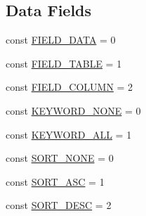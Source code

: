 \subsection*{Data Fields}
\begin{DoxyCompactItemize}
\item 
const \hyperlink{class_s_q_lite_database_ac3188f4350978425c488580c5cea8468}{F\+I\+E\+L\+D\+\_\+\+D\+A\+T\+A} = 0
\item 
const \hyperlink{class_s_q_lite_database_acbdf154a35cfc228dd1016e8aa4bd503}{F\+I\+E\+L\+D\+\_\+\+T\+A\+B\+L\+E} = 1
\item 
const \hyperlink{class_s_q_lite_database_a87aad3e89cc6a17f293cf5410b225bbe}{F\+I\+E\+L\+D\+\_\+\+C\+O\+L\+U\+M\+N} = 2
\item 
const \hyperlink{class_s_q_lite_database_a9b1a24ef01d468c146a71b333edb0c17}{K\+E\+Y\+W\+O\+R\+D\+\_\+\+N\+O\+N\+E} = 0
\item 
const \hyperlink{class_s_q_lite_database_ababb5c4af464938f3f0b8f9c4fa183ba}{K\+E\+Y\+W\+O\+R\+D\+\_\+\+A\+L\+L} = 1
\item 
const \hyperlink{class_s_q_lite_database_af3826c676cb54905f393f9d1f7ad48ea}{S\+O\+R\+T\+\_\+\+N\+O\+N\+E} = 0
\item 
const \hyperlink{class_s_q_lite_database_a9517f2622dfc5fbb0cc64feef247eb06}{S\+O\+R\+T\+\_\+\+A\+S\+C} = 1
\item 
const \hyperlink{class_s_q_lite_database_a0e633ab431ae1e5cc483a37cfe73bb09}{S\+O\+R\+T\+\_\+\+D\+E\+S\+C} = 2
\end{DoxyCompactItemize}
